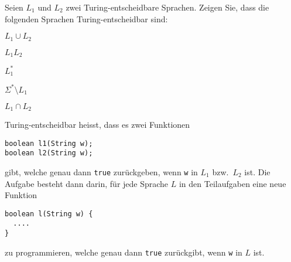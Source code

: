 Seien $L_1$ und $L_2$ zwei Turing-entscheidbare Sprachen. Zeigen Sie, dass
die folgenden Sprachen Turing-entscheidbar sind:
\begin{teilaufgaben}
\item $L_1\cup L_2$
\item $L_1L_2$
\item $L_1^*$
\item $\Sigma^*\setminus L_1$
\item $L_1\cap L_2$
\end{teilaufgaben}

\begin{hinweis}
Turing-entscheidbar heisst, dass es zwei Funktionen 
\begin{verbatim}
boolean l1(String w);
boolean l2(String w);
\end{verbatim}
gibt, welche genau dann \texttt{true} zurückgeben, wenn
\texttt{w} in $L_1$ bzw.~$L_2$ ist. Die Aufgabe
besteht dann darin, für jede Sprache $L$ in den Teilaufgaben eine neue
Funktion
\begin{verbatim}
boolean l(String w) {
  ....
}
\end{verbatim}
zu programmieren, welche genau dann \texttt{true} zurückgibt, wenn
\texttt{w} in $L$ ist.
\end{hinweis}

